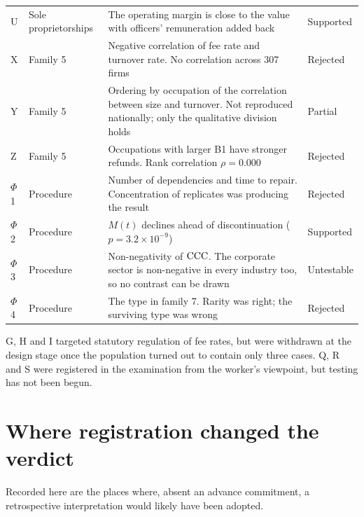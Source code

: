 \begin{longtable}{@{}ll>{\raggedright\arraybackslash}p{}l@{}}
U & Sole proprietorships & The operating margin is close to the value with officers' remuneration added back & Supported \\
X & Family 5 & Negative correlation of fee rate and turnover rate. No correlation across 307 firms & Rejected \\
Y & Family 5 & Ordering by occupation of the correlation between size and turnover. Not reproduced nationally; only the qualitative division holds & Partial \\
Z & Family 5 & Occupations with larger B1 have stronger refunds. Rank correlation $\rho=0.000$ & Rejected \\
$\Phi$1 & Procedure & Number of dependencies and time to repair. Concentration of replicates was producing the result & Rejected \\
$\Phi$2 & Procedure & $M(t)$ declines ahead of discontinuation ($p=3.2\times10^{-9}$) & Supported \\
$\Phi$3 & Procedure & Non-negativity of $\mathrm{CCC}$. The corporate sector is non-negative in every industry too, so no contrast can be drawn & Untestable \\
$\Phi$4 & Procedure & The type in family 7. Rarity was right; the surviving type was wrong & Rejected \\
\end{longtable}

G, H and I targeted statutory regulation of fee rates, but were withdrawn at the design stage
once the population turned out to contain only three cases. Q, R and S were registered in the
examination from the worker's viewpoint, but testing has not been begun.

\section{Where registration changed the verdict}

Recorded here are the places where, absent an advance commitment, a retrospective interpretation
would likely have been adopted.

